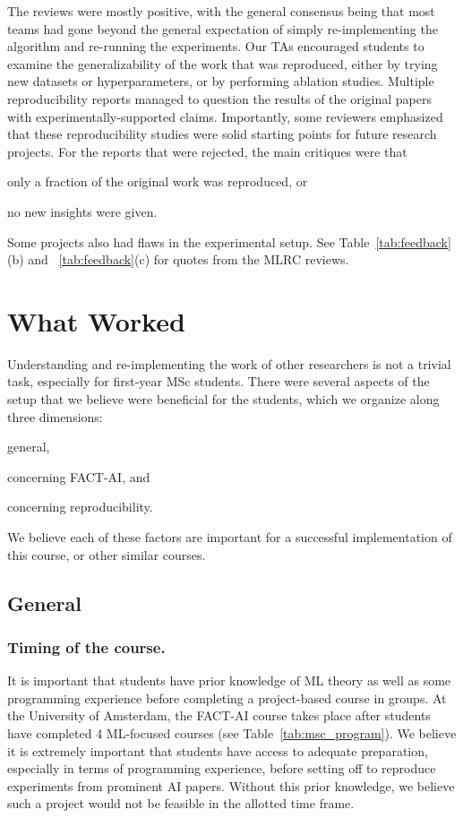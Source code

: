 \documentclass[letterpaper]{article}
\newcommand{\OurUniversity}{the University of Amsterdam}
\begin{document}
The reviews were mostly positive, with the general consensus being that most teams had gone beyond the general expectation of simply re-implementing the algorithm and re-running the experiments. 
Our TAs encouraged students to examine the generalizability of the work that was reproduced, either by trying new datasets or hyperparameters, or by performing ablation studies. 
Multiple reproducibility reports managed to question the results of the original papers with experimentally-supported claims. 
Importantly, some reviewers emphasized that these reproducibility studies were solid starting points for future research projects. 
For the reports that were rejected, the main critiques were that
\begin{enumerate*}[label=(\roman*)]
    \item only a fraction of the original work was reproduced, or 
    \item no new insights were given.
\end{enumerate*}
Some projects also had flaws in the experimental setup. 
See Table~\ref{tab:feedback}(b) and  ~\ref{tab:feedback}(c) for quotes from the MLRC reviews.  






\section{What Worked}
\label{section:whatworked}

Understanding and re-implementing the work of other researchers is not a trivial task, especially for first-year MSc students. There were several aspects of the setup that we believe were beneficial for the students, which we organize along three dimensions: 
\begin{enumerate*}[label=(\roman*)]
    \item general, 
    \item concerning FACT-AI, and 
    \item concerning reproducibility.
\end{enumerate*}
We believe each of these factors are important for a successful implementation of this course, or other similar courses. 

\subsection{General}

\subsubsection{Timing of the course.}
It is important that students have prior knowledge of ML theory as well as some programming experience before completing a project-based course in groups. At \OurUniversity{}, the FACT-AI course takes place after students have completed 4 ML-focused courses (see Table~\ref{tab:msc_program}). 
We believe it is extremely important that students have access to adequate preparation, especially in terms of programming experience, before setting off to reproduce experiments from prominent AI papers. 
Without this prior knowledge, we believe such a project would not be feasible in the allotted time frame. 
\end{document}
